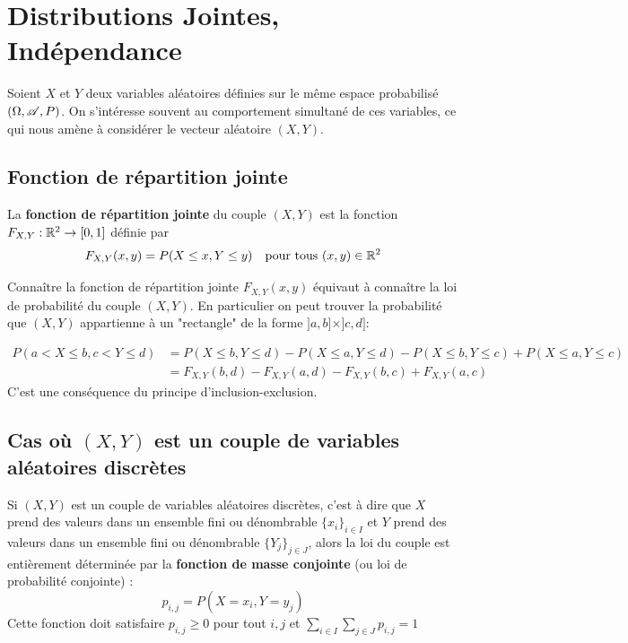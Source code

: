 \chapter{Distributions Jointes, Indépendance}

Soient $X$ et $Y$ deux variables aléatoires définies sur le même espace probabilisé $(\Omega, \mathscr{A}, P )$. On
s’intéresse souvent au comportement simultané de ces variables, ce qui nous amène à considérer
le vecteur aléatoire $(X, Y )$.

\section{Fonction de répartition jointe}

\begin{definition}
    La \textbf{fonction de répartition jointe} du couple $(X,Y)$ est la fonction $F_{X,Y}: \mathbb{R}^2 \to [0,1]$ définie par
    \[
    F_{X,Y}(x,y)= P(X\leq x, Y\leq y) \quad \text{pour tous }(x,y)\in \mathbb{R}^2
    \]
\end{definition}

Connaître la fonction de répartition jointe $F_{X,Y}(x,y)$ équivaut à connaître la loi de probabilité du couple $(X,Y)$.
En particulier on peut trouver la probabilité que $(X,Y)$ appartienne à un "rectangle" de la forme $]a,b] \times ]c,d]$:

\begin{align*}
    P(a<X\leq b, c<Y\leq d)&= P(X\leq b, Y\leq d) - P(X\leq a,Y\leq d) - P(X\leq b,Y\leq c) +P(X\leq a, Y\leq c)\\
    &= F_{X,Y}(b,d)-F_{X,Y}(a,d)-F_{X,Y}(b,c)+F_{X,Y}(a,c)
\end{align*}
C'est une conséquence du principe d'inclusion-exclusion.

\section{Cas où $(X,Y)$ est un couple de variables aléatoires discrètes}

Si $(X,Y)$ est un couple de variables aléatoires discrètes, c'est à dire que $X$ prend des valeurs dans un ensemble fini ou dénombrable $\{x_i\}_{i\in I}$ et $Y$ prend des valeurs dans un ensemble fini ou dénombrable $\{Y_j\}_{j\in J}$, alors la loi du couple est entièrement déterminée par la \textbf{fonction de masse conjointe} (ou loi de probabilité conjointe) :
\[
p_{i,j}=P(X=x_i,Y=y_j)
\]
Cette fonction doit satisfaire $p_{i,j}\ge 0$ pour tout $i,j$ et $\sum_{i\in I}\sum_{j\in J}p_{i,j}=1$ 

